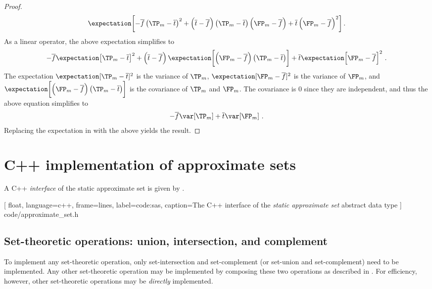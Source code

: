 \documentclass[ ../main.tex]{subfiles}
\begin{document}
\begin{proof}
\begin{equation}
\begin{split}
    \expectation\biggl[-\overline{f} \left(\TP_m - \overline{t}\right)^2 + 
    \left(\overline{t}-\overline{f}\right)\left(\TP_m - \overline{t}\right)\left(\FP_m - \overline{f}\right) + \overline{t}\left(\FP_m - \overline{f}\right)^2\biggr]\,.
\end{split}
\end{equation}
As a linear operator, the above expectation simplifies to
\begin{equation}
    -\overline{f} \expectation\!\left[\TP_m - \overline{t}\right]^2 + \left(\overline{t}-\overline{f}\right)\expectation\!\left[\left(\FP_m - \overline{f}\right)\left(\TP_m - \overline{t}\right)\right] + \overline{t}\expectation\!\left[\FP_m - \overline{f}\right]^2\,.
\end{equation}
The expectation $\expectation[\TP_m - \overline{t}]^2$ is the variance of $\TP_m$, $\expectation[\FP_m - \overline{f}]^2$ is the variance of $\FP_m$, and $\expectation\!\left[\left(\FP_m - \overline{f}\right)\left(\TP_m - \overline{t}\right)\right]$ is the covariance of $\TP_m$ and $\FP_m$. The covariance is $0$ since they are independent, and thus the above equation simplifies to
\begin{equation}
    -\overline{f} \var\!\left[\TP_m\right] + \overline{t}\var\!\left[\FP_m\right]\,.
\end{equation}
Replacing the expectation in  with the above yields the result.
\end{proof}

\section{C++ implementation of approximate sets}
\label{sec:impl}
A C++ \emph{interface} of the static approximate set is given by .

[
    float,
    language=c++,
    frame=lines,
    label={code:sas},
    caption={The C++ interface of the \emph{static approximate set}} abstract data type
]
{code/approximate_set.h}

\subsection{Set-theoretic operations: union, intersection, and complement}
\label{sec:impl:set_theory}
To implement any set-theoretic operation, only set-intersection and set-complement (or set-union and set-complement) need to be implemented. Any other set-theoretic operation may be implemented by composing these two operations as described in \Cref{}. For efficiency, however, other set-theoretic operations may be \emph{directly} implemented.
\end{document}
